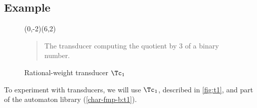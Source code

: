 \documentclass[a4paper]{report}
\newenvironment{legend}{%
  \begin{quote}%
    }{%
  \end{quote}%
}
\newcommand{\tafkit}{\textsc{TAF-Kit}\xspace}
\begin{document}
\subsection{Example}

\begin{figure}[tp]
  \begin{center}
    \begin{VCPicture}{(0,-2)(6,2)}
        
    \end{VCPicture}
    \begin{legend}
      The transducer computing the quotient by 3 of a binary number.
    \end{legend}
    \caption{Rational-weight transducer $\Tc_1$}
    \label{fig:t1}
  \end{center}
\end{figure}


To experiment with transducers, we will use $\Tc_1$,
described in \autoref{fig:t1}, and part of the automaton library
(\autoref{char-fmp-b:t1}).

\end{document}
